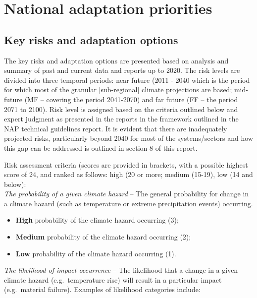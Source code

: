 \documentclass[
]{book}
\providecommand{\tightlist}{%
  \setlength{\itemsep}{0pt}\setlength{\parskip}{0pt}}
\begin{document}
\hypertarget{national-adaptation-priorities}{%
\chapter{National adaptation priorities}\label{national-adaptation-priorities}}

\hypertarget{key-risks-and-adaptation-options}{%
\section{Key risks and adaptation options}\label{key-risks-and-adaptation-options}}

The key risks and adaptation options are presented based on analysis and summary of past and current data and reports up to 2020. The risk levels are divided into three temporal periods: near future (2011 - 2040 which is the period for which most of the granular {[}sub-regional{]} climate projections are based; mid-future (MF -- covering the period 2041-2070) and far future (FF -- the period 2071 to 2100). Risk level is assigned based on the criteria outlined below and expert judgment as presented in the reports in the framework outlined in the NAP technical guidelines report. It is evident that there are inadequately projected risks, particularly beyond 2040 for most of the systems/sectors and how this gap can be addressed is outlined in section 8 of this report.

Risk assessment criteria (scores are provided in brackets, with a possible highest score of 24, and ranked as follows: high (20 or more; medium (15-19), low (14 and below):\\
\emph{The probability of a given climate hazard} -- The general probability for change in a climate hazard (such as temperature or extreme precipitation events) occurring.

\begin{itemize}
\tightlist
\item
  \textbf{High} probability of the climate hazard occurring (3);
\item
  \textbf{Medium} probability of the climate hazard occurring (2);
\item
  \textbf{Low} probability of the climate hazard occurring (1).
\end{itemize}

\emph{The likelihood of impact occurrence} -- The likelihood that a change in a given climate hazard (e.g.~temperature rise) will result in a particular impact (e.g.~material failure). Examples of likelihood categories include:
\end{document}
